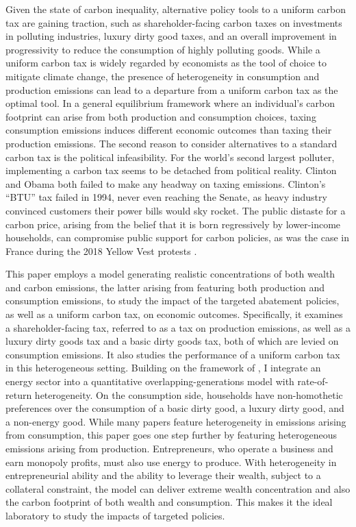 \documentclass[12pt,a4paper]{article}
\begin{document}
\hspace*{6mm} Given the state of carbon inequality, alternative policy tools to a uniform carbon tax are gaining traction, such as shareholder-facing carbon taxes on investments in polluting industries, luxury dirty good taxes, and an overall improvement in progressivity to reduce the consumption of highly polluting goods. While a uniform carbon tax is widely regarded by economists as the tool of choice to mitigate climate change, the presence of heterogeneity in consumption and production emissions can lead to a departure from a uniform carbon tax as the optimal tool. In a general equilibrium framework where an individual's carbon footprint can arise from both production and consumption choices, taxing consumption emissions induces different economic outcomes than taxing their production emissions. The second reason to consider alternatives to a standard carbon tax is the political infeasibility. For the world's second largest polluter, implementing a carbon tax seems to be detached from political reality. Clinton and Obama both failed to make any headway on taxing emissions. Clinton's ``BTU'' tax failed in 1994, never even reaching the Senate, as heavy industry convinced customers their power bills would sky rocket. The public distaste for a carbon price, arising from the belief that it is born regressively by lower-income households, can compromise public support for carbon policies, as was the case in France during the 2018 Yellow Vest protests \citep{DOUENNE2020106496}.

\hspace*{6mm} This paper employs a model generating realistic concentrations of both wealth and carbon emissions, the latter arising from featuring both production and consumption emissions, to study the impact of the targeted abatement policies, as well as a uniform carbon tax, on economic outcomes. Specifically, it examines a shareholder-facing tax, referred to as a tax on production emissions, as well as a luxury dirty goods tax and a basic dirty goods tax, both of which are levied on consumption emissions. It also studies the performance of a uniform carbon tax in this heterogeneous setting. Building on the framework of \cite{GETAL}, I integrate an energy sector into a quantitative overlapping-generations model with rate-of-return heterogeneity. On the consumption side, households have non-homothetic preferences over the consumption of a basic dirty good, a luxury dirty good, and a non-energy good. While many papers feature heterogeneity in emissions arising from consumption, this paper goes one step further by featuring heterogeneous emissions arising from production. Entrepreneurs, who operate a business and earn monopoly profits, must also use energy to produce. With heterogeneity in entrepreneurial ability and the ability to leverage their wealth, subject to a collateral constraint, the model can deliver extreme wealth concentration and also the carbon footprint of both wealth and consumption. This makes it the ideal laboratory to study the impacts of targeted policies. 
\end{document}
